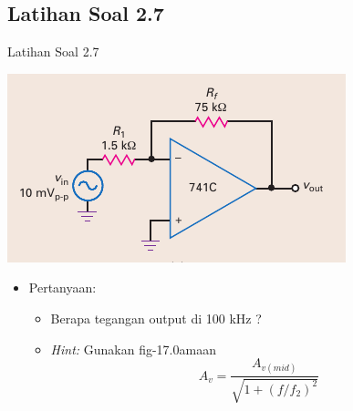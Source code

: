 \subsection{Latihan Soal 2.7}
\begin{frame}[t]{Latihan Soal 2.7}
	\begin{multicols}{2}
		\begin{center}
			\includegraphics[width=\linewidth]{gambar/fig-16.16a}
		\end{center}
		\columnbreak
		\begin{itemize}
			\item Pertanyaan:
			\begin{itemize}
				\item Berapa tegangan output di 100 kHz ?
				\item \textit{Hint:} Gunakan fig-17.0amaan \[ A_v = \frac{A_{v(mid)}}{ \sqrt{1 + (f/f_2)^2} } \]
			\end{itemize}
		\end{itemize}
	\end{multicols}
\end{frame}

